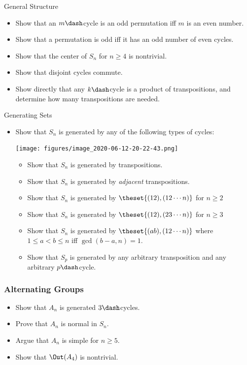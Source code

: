 General Structure

\begin{itemize}
\tightlist
\item
  Show that an \(m\dash\)cycle is an odd permutation iff \(m\) is an
  even number.
\item
  Show that a permutation is odd iff it has an odd number of even
  cycles.
\item
  Show that the center of \(S_n\) for \(n\geq 4\) is nontrivial.
\item
  Show that disjoint cycles commute.
\item
  Show directly that any \(k\dash\)cycle is a product of transpositions,
  and determine how many transpositions are needed.
\end{itemize}

Generating Sets

\begin{itemize}
\item
  Show that \(S_n\) is generated by any of the following types of
  cycles:

  \texttt{[image: figures/image\_2020-06-12-20-22-43.png]}

  \begin{itemize}
  \tightlist
  \item
    Show that \(S_n\) is generated by transpositions.
  \item
    Show that \(S_n\) is generated by \emph{adjacent} transpositions.
  \item
    Show that \(S_n\) is generated by \(\theset{(12), (12\cdots n)}\)
    for \(n\geq 2\)
  \item
    Show that \(S_n\) is generated by \(\theset{(12), (23\cdots n)}\)
    for \(n\geq 3\)
  \item
    Show that \(S_n\) is generated by \(\theset{(ab), (12\cdots n)}\)
    where \(1\leq a<b\leq n\) iff \(\gcd(b-a, n) = 1\).
  \item
    Show that \(S_p\) is generated by any arbitrary transposition and
    any arbitrary \(p\dash\)cycle.
  \end{itemize}
\end{itemize}

\hypertarget{alternating-groups}{%
\subsubsection{Alternating Groups}\label{alternating-groups}}

\begin{itemize}
\tightlist
\item
  Show that \(A_n\) is generated \(3\dash\)cycles.
\item
  Prove that \(A_n\) is normal in \(S_n\).
\item
  Argue that \(A_n\) is simple for \(n \geq 5\).
\item
  Show that \(\Out(A_4)\) is nontrivial.
\end{itemize}

